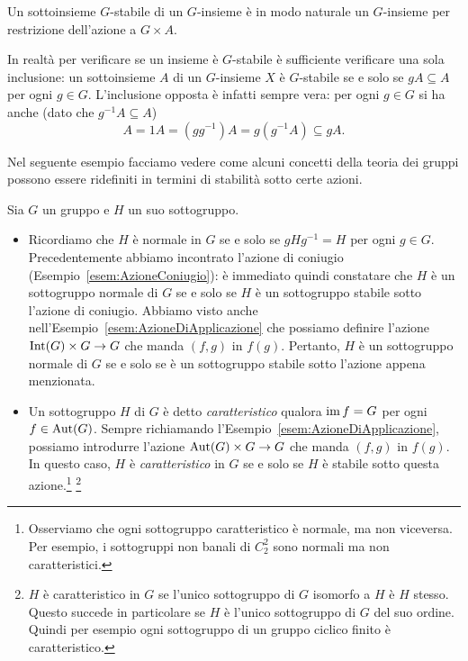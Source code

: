 \begin{osse}
Un sottoinsieme $G$-stabile di un $G$-insieme è in modo naturale un $G$-insieme per restrizione dell'azione a $G\times A$.
\end{osse}

\begin{osse}
In realtà per verificare se un insieme è $G$-stabile è sufficiente verificare una sola inclusione: un sottoinsieme $A$ di un $G$-insieme $X$ è $G$-stabile se e solo se $gA \subseteq A$ per ogni $g \in G$. L'inclusione opposta è infatti sempre vera: per ogni $g \in G$ si ha anche (dato che $g^{-1}A \subseteq A$)
\[A = 1A = (gg^{-1})A = g(g^{-1}A) \subseteq gA .\]
\end{osse}


Nel seguente esempio facciamo vedere come alcuni concetti della teoria dei gruppi possono essere ridefiniti in termini di stabilità sotto certe azioni.

\begin{esem}
Sia $G$ un gruppo e $H$ un suo sottogruppo.
\begin{itemize}
\item Ricordiamo che $H$ è normale in $G$ se e solo se $gHg^{-1} = H$ per ogni $g \in G$. Precedentemente abbiamo incontrato l'azione di coniugio (Esempio~\ref{esem:AzioneConiugio}): è immediato quindi constatare che $H$ è un sottogruppo normale di $G$ se e solo se $H$ è un sottogruppo stabile sotto l'azione di coniugio. Abbiamo visto anche nell'Esempio~\ref{esem:AzioneDiApplicazione} che possiamo definire l'azione $\mathrm{Int}(G) \times G \to G$ che manda $(f, g)$ in $f(g)$. Pertanto, $H$ è un sottogruppo normale di $G$ se e solo se è un sottogruppo stabile sotto l'azione appena menzionata. 
\item Un sottogruppo $H$ di $G$ è detto {\em caratteristico} qualora $\operatorname{im} f = G$ per ogni $f \in \mathrm{Aut}(G)$. Sempre richiamando l'Esempio~\ref{esem:AzioneDiApplicazione}, possiamo introdurre l'azione $\mathrm{Aut}(G) \times G \to G$ che manda $(f, g)$ in $f(g)$. In questo caso, $H$ è {\em caratteristico} in $G$ se e solo se $H$ è stabile sotto questa azione.\footnote{Osserviamo che ogni sottogruppo caratteristico è normale, ma non viceversa. Per esempio, i sottogruppi non banali di $C_2^2$ sono normali ma non caratteristici.} \footnote{$H$ è caratteristico in $G$ se l'unico sottogruppo di $G$ isomorfo a $H$ è $H$ stesso. Questo succede in particolare se $H$ è l'unico sottogruppo di $G$ del suo ordine. Quindi per esempio ogni sottogruppo di un gruppo ciclico finito è caratteristico.}
\end{itemize}
\end{esem}

